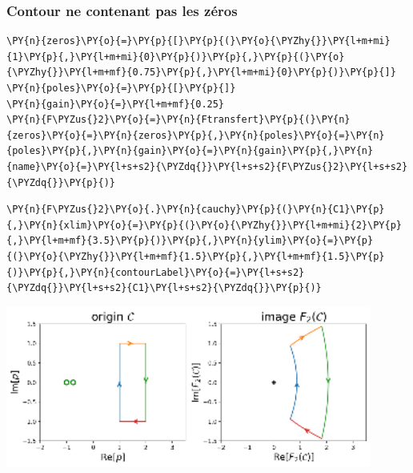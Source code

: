 \subsubsection{Contour ne contenant pas les zéros\label{contour-nentourant-pas-les-zuxe9ros}}
\begin{tcolorbox}[breakable, size=fbox, boxrule=1pt, pad at break*=1mm,colback=cellbackground, colframe=cellborder]
\begin{Verbatim}[commandchars=\\\{\}]
\PY{n}{zeros}\PY{o}{=}\PY{p}{[}\PY{p}{(}\PY{o}{\PYZhy{}}\PY{l+m+mi}{1}\PY{p}{,}\PY{l+m+mi}{0}\PY{p}{)}\PY{p}{,}\PY{p}{(}\PY{o}{\PYZhy{}}\PY{l+m+mf}{0.75}\PY{p}{,}\PY{l+m+mi}{0}\PY{p}{)}\PY{p}{]}
\PY{n}{poles}\PY{o}{=}\PY{p}{[}\PY{p}{]}
\PY{n}{gain}\PY{o}{=}\PY{l+m+mf}{0.25}
\PY{n}{F\PYZus{}2}\PY{o}{=}\PY{n}{Ftransfert}\PY{p}{(}\PY{n}{zeros}\PY{o}{=}\PY{n}{zeros}\PY{p}{,}\PY{n}{poles}\PY{o}{=}\PY{n}{poles}\PY{p}{,}\PY{n}{gain}\PY{o}{=}\PY{n}{gain}\PY{p}{,}\PY{n}{name}\PY{o}{=}\PY{l+s+s2}{\PYZdq{}}\PY{l+s+s2}{F\PYZus{}2}\PY{l+s+s2}{\PYZdq{}}\PY{p}{)}
\end{Verbatim}
\end{tcolorbox}
\begin{tcolorbox}[breakable, size=fbox, boxrule=1pt, pad at break*=1mm,colback=cellbackground, colframe=cellborder]
\begin{Verbatim}[commandchars=\\\{\}]
\PY{n}{F\PYZus{}2}\PY{o}{.}\PY{n}{cauchy}\PY{p}{(}\PY{n}{C1}\PY{p}{,}\PY{n}{xlim}\PY{o}{=}\PY{p}{(}\PY{o}{\PYZhy{}}\PY{l+m+mi}{2}\PY{p}{,}\PY{l+m+mf}{3.5}\PY{p}{)}\PY{p}{,}\PY{n}{ylim}\PY{o}{=}\PY{p}{(}\PY{o}{\PYZhy{}}\PY{l+m+mf}{1.5}\PY{p}{,}\PY{l+m+mf}{1.5}\PY{p}{)}\PY{p}{,}\PY{n}{contourLabel}\PY{o}{=}\PY{l+s+s2}{\PYZdq{}}\PY{l+s+s2}{C1}\PY{l+s+s2}{\PYZdq{}}\PY{p}{)}
\end{Verbatim}
\end{tcolorbox}
\begin{center}
    \includegraphics[width=0.9\textwidth]{notebook/fig/output_24_1.eps}
\end{center}

